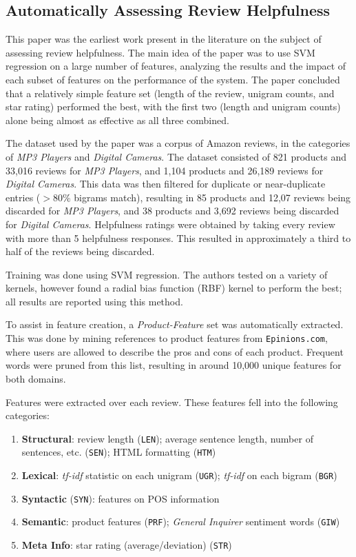 \documentclass[letter,12pt]{article}
\begin{document}
\subsection{Automatically Assessing Review Helpfulness \cite{2006kim-helpfulness}}
This paper was the earliest work present in the literature on the subject of assessing review helpfulness.
The main idea of the paper was to use SVM regression on a large number of features,
	analyzing the results and the impact of each subset of features on the performance
	of the system.
The paper concluded that a relatively simple feature set (length of the review,
	unigram counts, and star rating) performed the best, with the first two
	(length and unigram counts) alone being almost as effective as all three
	combined.

The dataset used by the paper was a corpus of Amazon reviews, in the categories
	of {\em MP3 Players} and {\em Digital Cameras}.
The dataset consisted of 821 products and 33,016 reviews for {\em MP3 Players},
	and 1,104 products and 26,189 reviews for {\em Digital Cameras}.
This data was then filtered for duplicate or near-duplicate entries ($>80\%$ bigrams match),
	resulting in 85 products and 12,07 reviews being discarded for {\em MP3 Players},
	and 38 products and 3,692 reviews being discarded for {\em Digital Cameras}.
Helpfulness ratings were obtained by taking every review with more than 5 helpfulness
	responses.
This resulted in approximately a third to half of the reviews being discarded.

Training was done using SVM regression.
The authors tested on a variety of kernels, however found a radial bias function (RBF)
	kernel to perform the best; all results are reported using this method.

To assist in feature creation, a {\em Product-Feature} set was automatically extracted.
This was done by mining references to product features from {\tt Epinions.com},
	where users are allowed to describe the pros and cons of each product.
Frequent words were pruned from this list, resulting in around 10,000 unique features
	for both domains.

Features were extracted over each review.
These features fell into the following categories:
\begin{enumerate}
	\item {\bf Structural}: review length ({\tt LEN}); average sentence length, 
		number of sentences, etc. ({\tt SEN}); 
		HTML formatting ({\tt HTM})
	\item {\bf Lexical}: {\it tf-idf} statistic on each unigram ({\tt UGR});
		{\it tf-idf} on each bigram ({\tt BGR})
	\item {\bf Syntactic} ({\tt SYN}): features on POS information
	\item {\bf Semantic}: product features ({\tt PRF}); 
		{\it General Inquirer} sentiment words ({\tt GIW}) 
	\item {\bf Meta Info}: star rating (average/deviation) ({\tt STR})
\end{enumerate}
\end{document}
